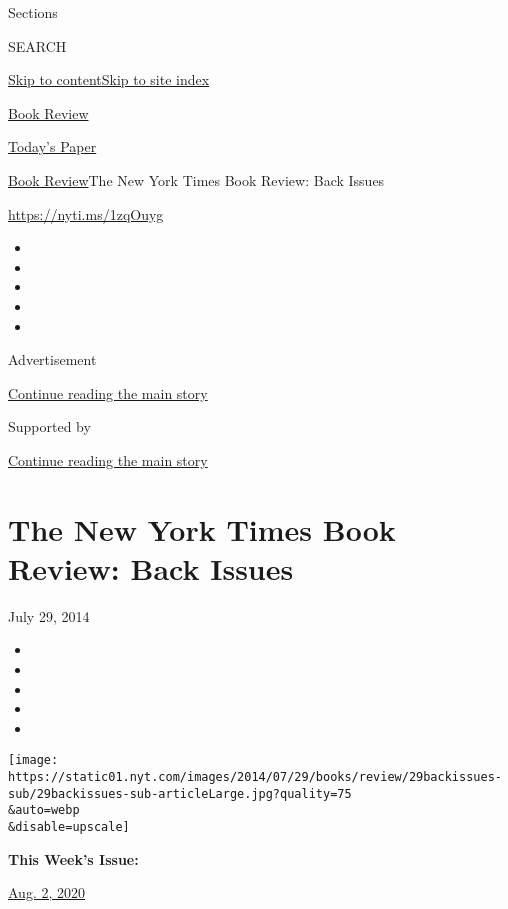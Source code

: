 Sections

SEARCH

\protect\hyperlink{site-content}{Skip to
content}\protect\hyperlink{site-index}{Skip to site index}

\href{https://www.nytimes.com/section/books/review}{Book Review}

\href{https://myaccount.nytimes.com/auth/login?response_type=cookie\&client_id=vi}{}

\href{https://www.nytimes.com/section/todayspaper}{Today's Paper}

\href{/section/books/review}{Book Review}\textbar{}The New York Times
Book Review: Back Issues

\url{https://nyti.ms/1zqOuyg}

\begin{itemize}
\item
\item
\item
\item
\item
\end{itemize}

Advertisement

\protect\hyperlink{after-top}{Continue reading the main story}

Supported by

\protect\hyperlink{after-sponsor}{Continue reading the main story}

\hypertarget{the-new-york-times-book-review-back-issues}{%
\section{The New York Times Book Review: Back
Issues}\label{the-new-york-times-book-review-back-issues}}

July 29, 2014

\begin{itemize}
\item
\item
\item
\item
\item
\end{itemize}

\texttt{[image: https://static01.nyt.com/images/2014/07/29/books/review/29backissues-sub/29backissues-sub-articleLarge.jpg?quality=75\\\&auto=webp\\\&disable=upscale]}

\textbf{This Week's Issue:}

\href{https://www.nytimes.com/issue/todayspaper/2020/08/02/todays-new-york-times\#bookreview}{Aug.
2, 2020}


